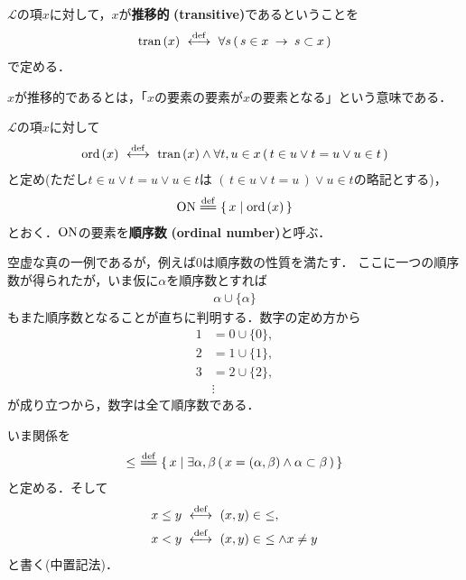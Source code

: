 	\begin{screen}
		\begin{dfn}[推移的類]
			$\mathcal{L}$の項$x$に対して，$x$が{\bf 推移的}
			{\bf (transitive)}であるということを
			\begin{align}
				\operatorname*{tran}\hspace{0.15em}(x) \ \overset{\mathrm{def}}{\longleftrightarrow}\ 
				\forall s\, (\, s \in x \hspace{0.25em}\rightarrow\hspace{0.25em} s \subset x\, )
			\end{align}
			で定める．
		\end{dfn}
	\end{screen}
	
	$x$が推移的であるとは，「$x$の要素の要素が$x$の要素となる」という意味である．
	
	\begin{screen}
		\begin{dfn}[順序数]
			$\mathcal{L}$の項$x$に対して
			\begin{align}
				\operatorname*{ord}\hspace{0.15em}(x) \ \overset{\mathrm{def}}{\longleftrightarrow}\  \operatorname*{tran}\hspace{0.15em}(x) \wedge 
				\forall t,u \in x\, (\, t \in u \vee t = u \vee u \in t\, )
			\end{align}
			と定め(ただし$t \in u \vee t = u \vee u \in t$は
			$(\, t \in u \vee t = u\, ) \vee u \in t$の略記とする)，
			\begin{align}
				\ON \defeq \Set{x}{\ord{x}}
			\end{align}
			とおく．$\mathrm{ON}$の要素を{\bf 順序数}\index{じゅんじょすう@順序数}
			{\bf (ordinal number)}と呼ぶ．
		\end{dfn}
	\end{screen}
	
	空虚な真の一例であるが，例えば$0$は順序数の性質を満たす．
	ここに一つの順序数が得られたが，いま仮に$\alpha$を順序数とすれば
	\begin{align}
		\alpha \cup \{\alpha\}
	\end{align}
	もまた順序数となることが直ちに判明する．数字の定め方から
	\begin{align}
		1 &= 0 \cup \{0\}, \\
		2 &= 1 \cup \{1\}, \\
		3 &= 2 \cup \{2\}, \\
		&\vdots
	\end{align}
	が成り立つから，数字は全て順序数である．
	
	いま関係を
	\begin{align}
		\leq\ \defeq \Set{x}{\exists \alpha,\beta\, 
		(\, x=(\alpha,\beta) \wedge \alpha \subset \beta\, )}
	\end{align}
	と定める．そして
	\begin{align}
		x \leq y &\ \overset{\mathrm{def}}{\longleftrightarrow}\  (x,y) \in\ \leq, \\
		x < y &\ \overset{\mathrm{def}}{\longleftrightarrow}\  (x,y) \in\ \leq \wedge x \neq y
	\end{align}
	と書く(中置記法)．
	
